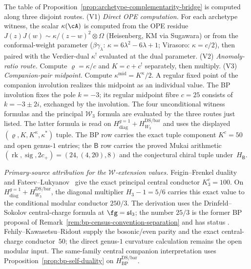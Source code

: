 \begin{remark}
\label{rem:archetype-complementarity-three-path}
The table of
Proposition~\textup{\ref{prop:archetype-complementarity-bridge}} is
computed along three disjoint routes.
\textup{(V1)} \emph{Direct OPE computation.} For each archetype
witness, the scalar $\kappa(\cA)$ is computed from the OPE residue
$J(z)J(w) \sim \kappa/(z-w)^2 \otimes \Omega$
\textup{(}Heisenberg, KM via Sugawara\textup{)} or from the
conformal-weight parameter
\textup{(}$\beta\gamma_\lambda$: $\kappa = 6\lambda^2 - 6\lambda + 1$;
Virasoro: $\kappa = c/2$\textup{)}, then paired with the Verdier-dual
$\kappa^!$ evaluated at the dual parameter.
\textup{(V2)} \emph{Anomaly-ratio route.} Compute $\varrho = \kappa/c$
and $K = c + c^!$ separately, then multiply.
\textup{(V3)} \emph{Companion-pair midpoint.} Compute
$\kappa^{\mathrm{mid}}=K^\kappa/2$.  A regular fixed point of the
companion involution realizes this midpoint as an individual value.
The BP involution fixes the pole $k=-3$; its regular midpoint fibre
$c=25$ consists of $k=-3\pm2i$, exchanged by the involution.
The four unconditional witness formulas and the principal
$\mathcal W_3$ formula are evaluated by the three routes just listed.
The latter formula is read on
$H_{\mathrm{diag}}^{g=1}+H_{W_3}^{\mathrm{DS/bar}}$
and uses the displayed $(\varrho,K,K^\kappa,\kappa^*)$ tuple.
The BP row carries the exact tuple component $K^c=50$ and open
genus-$1$ entries; the
$\mathsf B$ row carries the proved Mukai arithmetic
$(\operatorname{rk},\operatorname{sig},2c_+)=(24,(4,20),8)$ and the
conjectural chiral tuple under~$H_{\mathsf B}$.

\emph{Primary-source attribution for the $\mathcal{W}$-extension
values.} Feigin--Frenkel duality~\textup{\cite{Feigin-Frenkel}} and
Fateev--Lukyanov~\textup{\cite{FateevLukyanov88}} give the exact
principal central conductor $K_3^c=100$.  On
$H_{\mathrm{diag}}^{g=1}+H_{W_3}^{\mathrm{DS/bar}}$, the diagonal
multiplier $H_3-1=5/6$ carries this exact value to the conditional
modular conductor $250/3$.  The derivation uses the
Drinfeld--Sokolov central-charge formula at
$\fg = \mathfrak{sl}_3$; the number $25/3$
is the former BP proposal of
Remark~\textup{\ref{rem:bp-census-convention-separation}} and has
status \ClaimStatusConjectured.  Fehily--Kawasetsu--Ridout
\textup{\cite[\S2.1]{FKR20}} supply the bosonic/even parity and the
exact central-charge conductor~$50$; the direct genus-$1$ curvature
calculation remains the open modular input.  The same-family central
companion interpretation uses
Proposition~\textup{\ref{prop:bp-self-duality}} on
$H_{\mathrm{BP}}^{\mathrm{DS/bar}}$.
\end{remark}

